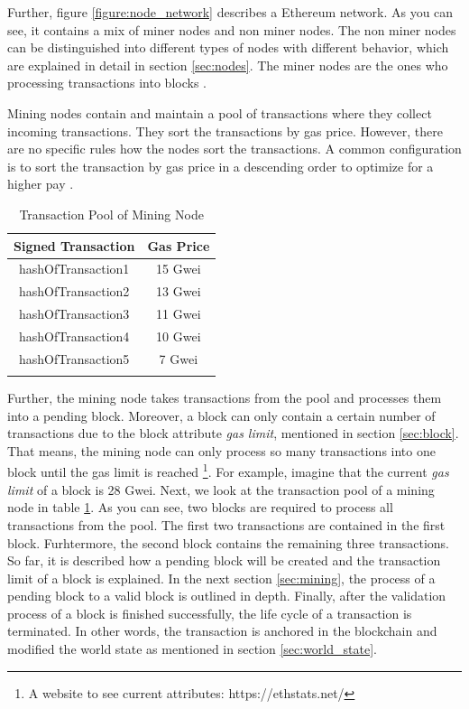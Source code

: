 \clearpage

Further, figure \ref{figure:node_network} describes a Ethereum network. 
As you can see, it contains a mix of miner nodes and non miner nodes. 
The non miner nodes can be distinguished into different types of nodes with different 
behavior, which are explained in detail in section \ref{sec:nodes}. 
The miner nodes are the ones who processing transactions into blocks . 

Mining nodes contain and maintain a pool of transactions where they collect incoming transactions. 
They sort the transactions by gas price. 
However, there are no specific rules how the nodes sort the transactions. 
A common configuration is to sort the transaction by gas price in a descending order to 
optimize for a higher pay .

\begin{longtable}{c|c}
	\hline
	Signed Transaction & Gas Price \\
	\hline
	hashOfTransaction1 & 15 Gwei \\
	hashOfTransaction2 & 13 Gwei \\
	hashOfTransaction3 & 11 Gwei \\
	hashOfTransaction4 & 10 Gwei \\
	hashOfTransaction5 & 7 Gwei \\
	\hline
	\caption{Transaction Pool of Mining Node}
	\label{table:sorted_gas_prices}
\end{longtable} 

Further, the mining node takes transactions from the pool and processes them into a pending block. 
Moreover, a block can only contain a certain number of transactions due to the block 
attribute \textit{gas limit}, mentioned in section \ref{sec:block}. 
That means, the mining node can only process so many transactions into one 
block until the gas limit is reached \footnote{A website to see 
current attributes: https://ethstats.net/}. For example, 
imagine that the current \textit{gas limit} of a block is 28 Gwei. 
Next, we look at the transaction pool of a mining node in 
table \ref{table:sorted_gas_prices}. As you can see, two blocks are 
required to process all transactions from the pool. The first two transactions 
are contained in the first block. Furhtermore, the second block contains the remaining 
three transactions. 
So far, it is described how a pending block will be created and the transaction 
limit of a block is explained. In the next section \ref{sec:mining}, 
the process of a pending block to a valid block is outlined in depth. 
Finally, after the validation process of a block is finished successfully, 
the life cycle of a transaction is terminated. In other words, the transaction is anchored 
in the blockchain and modified the world state as mentioned in section \ref{sec:world_state}.

